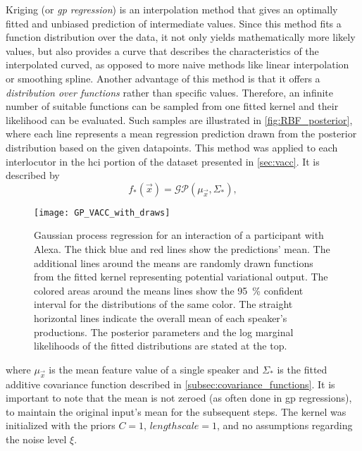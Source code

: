 Kriging (or \textit{\acl{gp} regression}) is an interpolation method that gives an optimally fitted and unbiased prediction of intermediate values.
Since this method fits a function distribution over the data, it not only yields mathematically more likely values, but also provides a curve that describes the characteristics of the interpolated curved, as opposed to more naive methods like linear interpolation or smoothing spline.
Another advantage of this method is that it offers a \textit{distribution over functions} rather than specific values.
Therefore, an infinite number of suitable functions can be sampled from one fitted kernel and their likelihood can be evaluated.
Such samples are illustrated in \cref{fig:RBF_posterior}, where each line represents a mean regression prediction drawn from the posterior distribution based on the given datapoints.
This method was applied to each interlocutor in the \ac{hci} portion of the dataset presented in \cref{sec:vacc}.
It is described by
%
\begin{equation}
	\label{eq:gp_function_prediction}
	f_*(\vec{x}) = \mathcal{GP}(\mu_{\vec{x}}, \Sigma_*),
\end{equation}
\noindent
%
\begin{figure}[t]
	\centering
	\texttt{[image: GP\_VACC\_with\_draws]}
	\caption[Gaussian process regression on a conversation with Alexa]
		{Gaussian process regression for an interaction of a participant with Alexa.
		The thick blue and red lines show the predictions' mean.
		The additional lines around the means are randomly drawn functions from the fitted kernel representing potential variational output.
		The colored areas around the means lines show the \SI{95}{\percent} confident interval for the distributions of the same color.
		The straight horizontal lines indicate the overall mean of each speaker's productions.
		The posterior parameters and the log marginal likelihoods of the fitted distributions are stated at the top.}
	\label{fig:gp_vacc}
\end{figure}
%
where $\mu_{\vec{x}}$ is the mean feature value of a single speaker and $\Sigma_*$ is the fitted additive covariance function described in \cref{subsec:covariance_functions}.
It is important to note that the mean is not zeroed (as often done in \ac{gp} regressions), to maintain the original input's mean for the subsequent steps.
The kernel was initialized with the priors $C = 1$, $lengthscale = 1$, and no assumptions regarding the noise level $\xi$.
